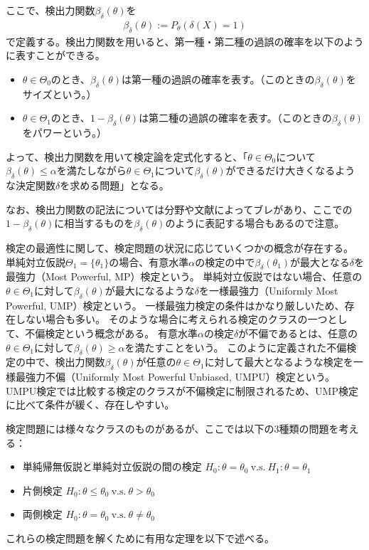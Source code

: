 \documentclass[11pt]{ltjsarticle}
\theoremstyle{definition}
\begin{document}
ここで、検出力関数$\beta_\delta(\theta)$を
\begin{align}
    \beta_\delta(\theta) := P_\theta(\delta(X)=1)
\end{align}
で定義する。検出力関数を用いると、第一種・第二種の過誤の確率を以下のように表すことができる。
\begin{itemize}
    \item $\theta\in \Theta_0$のとき、$\beta_\delta(\theta)$は第一種の過誤の確率を表す。（このときの$\beta_\delta(\theta)$をサイズという。）
    \item $\theta\in\Theta_1$のとき、$1-\beta_\delta(\theta)$は第二種の過誤の確率を表す。（このときの$\beta_\delta(\theta)$をパワーという。）
\end{itemize}
よって、検出力関数を用いて検定論を定式化すると、「$\theta\in\Theta_0$について$\beta_\delta(\theta)\le\alpha$を満たしながら$\theta\in\Theta_1$について$\beta_\delta(\theta)$ができるだけ大きくなるような決定関数$\delta$を求める問題」となる。

なお、検出力関数の記法については分野や文献によってブレがあり、ここでの$1-\beta_\delta(\theta)$に相当するものを$\beta_{\delta}(\theta)$のように表記する場合もあるので注意。

検定の最適性に関して、検定問題の状況に応じていくつかの概念が存在する。
単純対立仮説$\Theta_1=\{\theta_1\}$の場合、有意水準$\alpha$の検定の中で$\beta_\delta(\theta_1)$が最大となる$\delta$を最強力（Most Powerful, MP）検定という。
単純対立仮説ではない場合、任意の$\theta\in\Theta_1$に対して$\beta_\delta(\theta)$が最大になるような$\delta$を一様最強力（Uniformly Most Powerful, UMP）検定という。
一様最強力検定の条件はかなり厳しいため、存在しない場合も多い。
そのような場合に考えられる検定のクラスの一つとして、不偏検定という概念がある。
有意水準$\alpha$の検定$\delta$が不偏であるとは、任意の$\theta\in\Theta_1$に対して$\beta_\delta(\theta)\ge\alpha$を満たすことをいう。
このように定義された不偏検定の中で、検出力関数$\beta_\delta(\theta)$が任意の$\theta\in\Theta_1$に対して最大となるような検定を一様最強力不偏（Uniformly Most Powerful Unbiased, UMPU）検定という。
UMPU検定では比較する検定のクラスが不偏検定に制限されるため、UMP検定に比べて条件が緩く、存在しやすい。

検定問題には様々なクラスのものがあるが、ここでは以下の3種類の問題を考える：
\begin{itemize}
    \item 単純帰無仮説と単純対立仮説の間の検定 $H_0: \theta=\theta_0 \ \text{v.s.}\  H_1: \theta=\theta_1$
    \item 片側検定 $H_0: \theta\le\theta_0\ \text{v.s.}\ \theta>\theta_0$
    \item 両側検定 $H_0: \theta=\theta_0\ \text{v.s.}\ \theta\neq \theta_0$
\end{itemize}
これらの検定問題を解くために有用な定理を以下で述べる。
\end{document}
